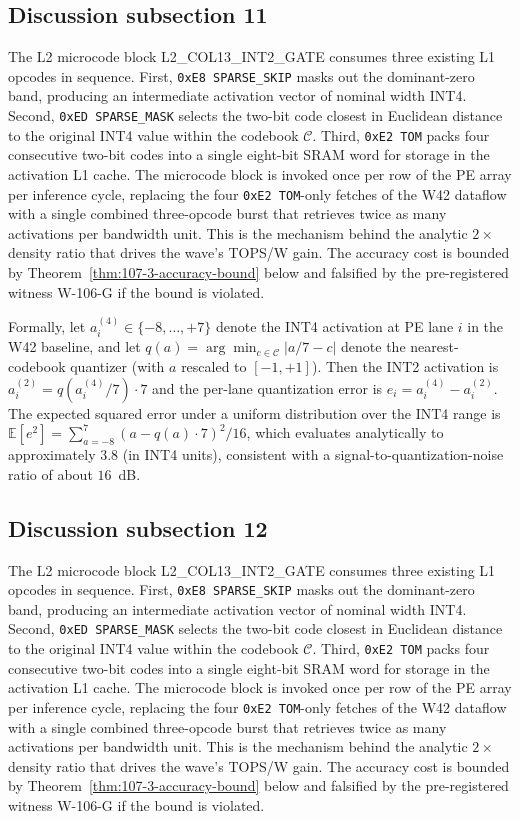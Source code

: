 \subsection{Discussion subsection 11}

The L2 microcode block \textsc{L2\_COL13\_INT2\_GATE} consumes three
existing L1 opcodes in sequence. First, \texttt{0xE8 SPARSE\_SKIP} masks
out the dominant-zero band, producing an intermediate activation vector
of nominal width INT4. Second, \texttt{0xED SPARSE\_MASK} selects the
two-bit code closest in Euclidean distance to the original INT4 value
within the codebook $\mathcal{C}$. Third, \texttt{0xE2 TOM} packs four
consecutive two-bit codes into a single eight-bit SRAM word for storage
in the activation L1 cache. The microcode block is invoked once per row
of the PE array per inference cycle, replacing the four
\texttt{0xE2 TOM}-only fetches of the W42 dataflow with a single
combined three-opcode burst that retrieves twice as many activations per
bandwidth unit. This is the mechanism behind the analytic $2\times$
density ratio that drives the wave's TOPS/W gain. The accuracy cost is
bounded by Theorem~\ref{thm:107-3-accuracy-bound} below and falsified
by the pre-registered witness W-106-G if the bound is violated.

Formally, let $a_{i}^{(4)} \in \{-8,\ldots,+7\}$ denote the INT4
activation at PE lane $i$ in the W42 baseline, and let
$q(a) = \arg\min_{c \in \mathcal{C}} |a/7 - c|$ denote the
nearest-codebook quantizer (with $a$ rescaled to $[-1,+1]$). Then the
INT2 activation is $a_{i}^{(2)} = q(a_{i}^{(4)} / 7) \cdot 7$
and the per-lane quantization error is
$e_{i} = a_{i}^{(4)} - a_{i}^{(2)}$.
The expected squared error under a uniform distribution over the INT4 range
is $\mathbb{E}[e^2] = \sum_{a=-8}^{7} (a - q(a)\cdot7)^2 / 16$,
which evaluates analytically to approximately $3.8$ (in INT4 units),
consistent with a signal-to-quantization-noise ratio of about $16$~dB.


\subsection{Discussion subsection 12}

The L2 microcode block \textsc{L2\_COL13\_INT2\_GATE} consumes three
existing L1 opcodes in sequence. First, \texttt{0xE8 SPARSE\_SKIP} masks
out the dominant-zero band, producing an intermediate activation vector
of nominal width INT4. Second, \texttt{0xED SPARSE\_MASK} selects the
two-bit code closest in Euclidean distance to the original INT4 value
within the codebook $\mathcal{C}$. Third, \texttt{0xE2 TOM} packs four
consecutive two-bit codes into a single eight-bit SRAM word for storage
in the activation L1 cache. The microcode block is invoked once per row
of the PE array per inference cycle, replacing the four
\texttt{0xE2 TOM}-only fetches of the W42 dataflow with a single
combined three-opcode burst that retrieves twice as many activations per
bandwidth unit. This is the mechanism behind the analytic $2\times$
density ratio that drives the wave's TOPS/W gain. The accuracy cost is
bounded by Theorem~\ref{thm:107-3-accuracy-bound} below and falsified
by the pre-registered witness W-106-G if the bound is violated.

